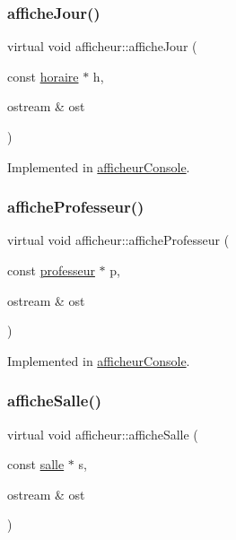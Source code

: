 \subsubsection{\texorpdfstring{affiche\+Jour()}{afficheJour()}}
{\footnotesize\ttfamily virtual void afficheur\+::affiche\+Jour (\begin{DoxyParamCaption}\item[{const \hyperlink{classhoraire}{horaire} $\ast$}]{h,  }\item[{ostream \&}]{ost }\end{DoxyParamCaption})\hspace{0.3cm}{\ttfamily [pure virtual]}}



Implemented in \hyperlink{classafficheur_console_a9d69206c3cd6409d1437ee546e71cf25}{afficheur\+Console}.

\hypertarget{classafficheur_a54b3e457d56738ed20641e5546872142}{}\label{classafficheur_a54b3e457d56738ed20641e5546872142} 
\subsubsection{\texorpdfstring{affiche\+Professeur()}{afficheProfesseur()}}
{\footnotesize\ttfamily virtual void afficheur\+::affiche\+Professeur (\begin{DoxyParamCaption}\item[{const \hyperlink{classprofesseur}{professeur} $\ast$}]{p,  }\item[{ostream \&}]{ost }\end{DoxyParamCaption})\hspace{0.3cm}{\ttfamily [pure virtual]}}



Implemented in \hyperlink{classafficheur_console_aa178d74ab314df687800c612a3615ed6}{afficheur\+Console}.

\hypertarget{classafficheur_af8b1bc89ba8c0f2acdd9a78f97a2949f}{}\label{classafficheur_af8b1bc89ba8c0f2acdd9a78f97a2949f} 
\subsubsection{\texorpdfstring{affiche\+Salle()}{afficheSalle()}}
{\footnotesize\ttfamily virtual void afficheur\+::affiche\+Salle (\begin{DoxyParamCaption}\item[{const \hyperlink{classsalle}{salle} $\ast$}]{s,  }\item[{ostream \&}]{ost }\end{DoxyParamCaption})\hspace{0.3cm}{\ttfamily [pure virtual]}}



